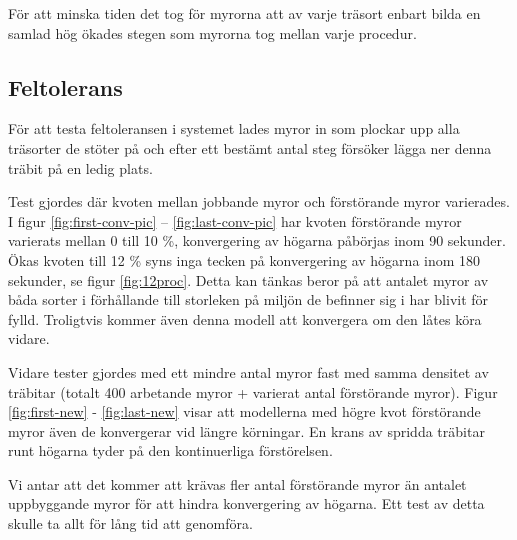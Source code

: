 \documentclass[titlepage, a4paper, 12pt]{article}
\begin{document}
För att minska tiden det tog för myrorna att av varje träsort enbart
bilda en samlad hög ökades stegen som myrorna tog mellan varje
procedur.

\subsection{Feltolerans}


För att testa feltoleransen i systemet lades myror in som plockar upp
alla träsorter de stöter på och efter ett bestämt antal steg försöker
lägga ner denna träbit på en ledig plats.

Test gjordes där kvoten mellan jobbande myror och förstörande myror
varierades.  I figur \ref{fig:first-conv-pic} –
\ref{fig:last-conv-pic} har kvoten förstörande myror varierats mellan
0 till 10 \%, konvergering av högarna påbörjas inom 90 sekunder. Ökas
kvoten till 12 \% syns inga tecken på konvergering av högarna inom 180
sekunder, se figur \ref{fig:12proc}. Detta kan tänkas beror på att
antalet myror av båda sorter i förhållande till storleken på miljön de
befinner sig i har blivit för fylld. Troligtvis kommer även denna
modell att konvergera om den låtes köra vidare.

Vidare tester gjordes med ett mindre antal myror fast med samma
densitet av träbitar (totalt 400 arbetande myror + varierat antal
förstörande myror). Figur \ref{fig:first-new} - \ref{fig:last-new}
visar att modellerna med högre kvot förstörande myror även de
konvergerar vid längre körningar. En krans av spridda träbitar runt
högarna tyder på den kontinuerliga förstörelsen.

Vi antar att det kommer att krävas fler antal förstörande myror än
antalet uppbyggande myror för att hindra konvergering av högarna. Ett
test av detta skulle ta allt för lång tid att genomföra.
\end{document}
